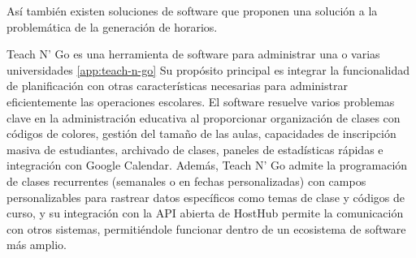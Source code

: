 Así también existen soluciones de software que proponen una solución a la problemática de la generación de horarios.

Teach N' Go es una herramienta de software para administrar una o varias universidades \ref{app:teach-n-go}
Su propósito principal es integrar la funcionalidad de planificación con otras características necesarias para administrar eficientemente las operaciones escolares.
El software resuelve varios problemas clave en la administración educativa al proporcionar organización de clases con códigos de colores, gestión del tamaño de las aulas, capacidades de inscripción masiva de estudiantes, archivado de clases, paneles de estadísticas rápidas e integración con Google Calendar.
Además, Teach N' Go admite la programación de clases recurrentes (semanales o en fechas personalizadas) con campos personalizables para rastrear datos específicos como temas de clase y códigos de curso, y su integración con la API abierta de HostHub permite la comunicación con otros sistemas, permitiéndole funcionar dentro de un ecosistema de software más amplio.